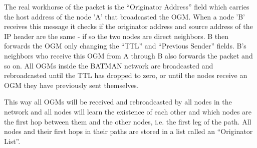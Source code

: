 The real workhorse of the packet is the ``Originator Address'' field which
carries the host address of the node 'A' that broadcasted the \ac{OGM}. When a
node 'B' receives this message it checks if the originator address and source
address of the IP header are the same - if so the two nodes are direct
neighbors. B then forwards the \ac{OGM} only changing the ``\ac{TTL}'' and
``Previous Sender'' fields. B's neighbors who receive this OGM from A through
B also forwards the packet and so on. All \acp{OGM} inside the BATMAN network
are broadcasted and rebroadcasted until the TTL has dropped to zero, or until
the nodes receive an \ac{OGM} they have previously sent themselves.

This way all \acp{OGM} will be received and rebroadcasted by all nodes in the
network and all nodes will learn the existence of each other and which nodes are
the first hop between them and the other nodes, i.e. the first leg of the path.
All nodes and their first hops in their paths are stored in a list called an
``Originator List''.

